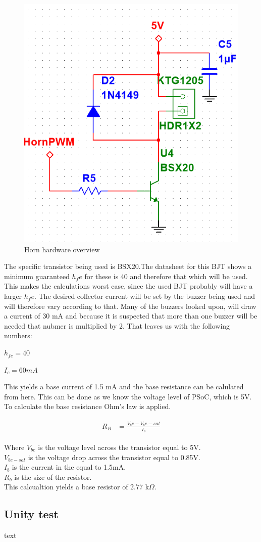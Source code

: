 \begin{figure}[H]
	\centering
	\includegraphics[width=0.7\linewidth]{Hardware/Pictures/Horn_hw}
	\caption{Horn hardware overview}
	\label{fig:Horn control}
\end{figure}

The specific transistor being used is BSX20.The datasheet  for this BJT shows a minimum guaranteed $h_fe$ for these is 40 and therefore that which will be used. This makes the calculations worst case, since the used BJT probably will have a larger $h_fe$. The desired collector current will be set by the buzzer being used and will therefore vary according to that. Many of the buzzers looked upon, will draw a current of 30 mA and because it is suspected that more than one buzzer will be needed that nubmer is multiplied by 2. That leaves us with the following numbers:

$h_{fe} = 40 $ 

$I_c = 60 mA$

This yields a base current of 1.5 mA and the base resistance can be calulated from here. This can be done as we know the voltage level of PSoC, which is 5V. \\
To calculate the base resistance Ohm's law is applied. 

\begin{align}
	\begin{split}
		R_B &= \frac{V_be - V_be-sat}{I_b}
	\end{split}
\end{align}

Where $V_{be}$ is the voltage level across the transistor equal to 5V. \\ 
$V_{be-sat}$ is the voltage drop across the transistor equal to 0.85V. \\ 
$I_b$ is the current in the equal to 1.5mA.  \\
$R_b$ is the size of the resistor. \\ 

This calcualtion yields a base resistor of 2.77 k$\Omega$.

\subsection{Unity test}
text